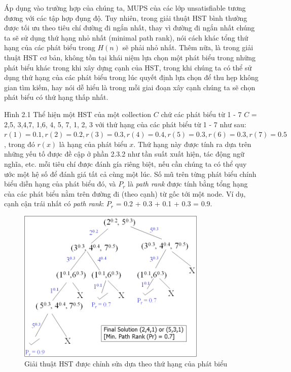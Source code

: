 	\hspace*{.05\textwidth} Áp dụng vào trường hợp của chúng ta, MUPS của các lớp unsatisfiable tương đương với các tập hợp đụng độ. Tuy nhiên, trong giải thuật HST bình thường được tối ưu theo tiêu chí đường đi ngắn nhất, thay vì đường đi ngắn nhất chúng ta sẽ sử dụng thứ hạng nhỏ nhất (minimal path rank), nói cách khác tổng thứ hạng của các phát biểu trong $H(n)$ sẽ phải nhỏ nhất. Thêm nữa, là trong giải thuật HST cơ bản, không tồn tại khái niệm lựa chọn một phát biểu trong những phát biểu khác trong khi xây dựng cạnh của HST, trong khi chúng ta có thể sử dụng thứ hạng của các phát biểu trong lúc quyết định lựa chọn để thu hẹp không gian tìm kiếm, hay nói dễ hiểu là trong mỗi giai đoạn xây cạnh chúng ta sẽ chọn phát biểu có thứ hạng thấp nhất.
	
	\hspace*{.05\textwidth} Hình 2.1 Thể hiện một HST của một collection $C$ chứ các phát biểu từ 1 - 7  $C$ = {{2,5}, {3,4,7}, {1,6}, {4, 5, 7}, {1, 2, 3}} với thứ hạng của các phát biểu từ 1 - 7 như sau: $r(1) = 0.1, r(2) = 0.2, r(3) = 0.3, r(4) = 0.4, r(5) = 0.3, r(6) = 0.3, r(7) = 0.5$, trong đó $r(x)$ là hạng của phát biểu $x$. Thứ hạng này được tính ra dựa trên những yếu tố được đề cập ở phần 2.3.2 như tần suất xuất hiện, tác động ngữ nghĩa, etc. mỗi tiêu chí được đánh gía riêng biệt, nếu cần chúng ta có thể quy ước một hệ số để đánh giá tất cả cùng một lúc. Số mũ trên từng phát biểu chính biểu diễn hạng của phát biểu đó, và $P_{r}$ là \textit{path rank} được tính bằng tổng hạng của các phát biểu nằm trên đường đi (theo cạnh) từ gốc tới một node. Ví dụ, cạnh cận trái nhất có \textit{path rank}: $P_{r}$ = 0.2 + 0.3 + 0.1 + 0.3 = 0.9.
	\begin{figure}[ht!]
			\centering
			\includegraphics[width=90mm]{Figures/fig1.png}
			\caption{Giải thuật HST được chỉnh sửa dựa theo thứ hạng của phát biểu \label{overflow}}
	\end{figure}
	
